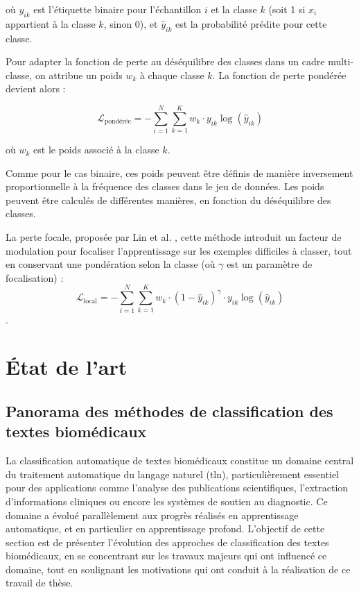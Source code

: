 \documentclass[12pt]{report}
\begin{document}
où $y_{ik}$ est l'étiquette binaire pour l'échantillon $i$ et la classe $k$ (soit 1 si $x_i$ appartient à la classe $k$, sinon 0), et $\hat{y}_{ik}$ est la probabilité prédite pour cette classe.

Pour adapter la fonction de perte au déséquilibre des classes dans un cadre multi-classe, on attribue un poids $w_k$ à chaque classe $k$. La fonction de perte pondérée devient alors :

$$
\mathcal{L}_\text{pondérée} = - \sum_{i=1}^{N} \sum_{k=1}^{K} w_k \cdot y_{ik} \log(\hat{y}_{ik})
$$

où $w_k$ est le poids associé à la classe $k$.

Comme pour le cas binaire, ces poids peuvent être définis de manière inversement proportionnelle à la fréquence des classes dans le jeu de données. Les poids peuvent être calculés de différentes manières, en fonction du déséquilibre des classes. 

La perte focale, proposée par Lin et al. \cite{Lin2017Focal}, cette méthode introduit un facteur de modulation pour focaliser l'apprentissage sur les exemples difficiles à classer, tout en conservant une pondération selon la classe (où $\gamma$ est un paramètre de focalisation) :
$$
\mathcal{L}_\text{local} = - \sum_{i=1}^{N} \sum_{k=1}^{K} w_k \cdot (1 - \hat{y}_{ik})^\gamma \cdot y_{ik} \log(\hat{y}_{ik})
$$.

\chapter{État de l’art}

\section{Panorama des méthodes de classification des textes biomédicaux}

La classification automatique de textes biomédicaux constitue un domaine central du traitement automatique du langage naturel (\gls{tln}), particulièrement essentiel pour des applications comme l'analyse des publications scientifiques, l'extraction d'informations cliniques ou encore les systèmes de soutien au diagnostic. Ce domaine a évolué parallèlement aux progrès réalisés en apprentissage automatique, et en particulier en apprentissage profond. L'objectif de cette section est de présenter l'évolution des approches de classification des textes biomédicaux, en se concentrant sur les travaux majeurs qui ont influencé ce domaine, tout en soulignant les motivations qui ont conduit à la réalisation de ce travail de thèse.
\end{document}
